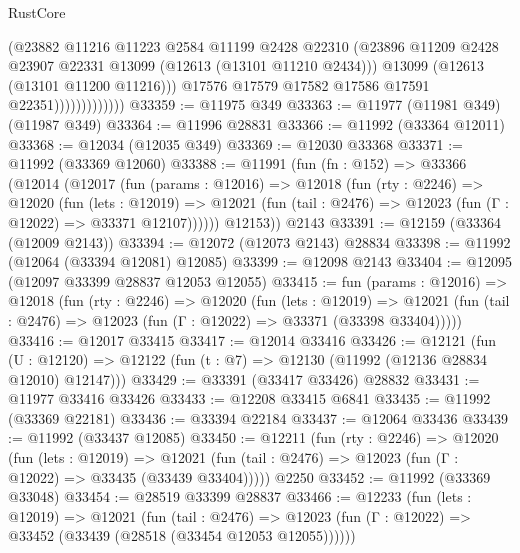 \begin{lexlean}{RustCore}
\begin{coremodule}
                              (@23882
                                @11216
                                @11223
                                @2584
                                @11199
                                @2428
                                @22310
                                (@23896
                                  @11209
                                  @2428
                                  @23907
                                  @22331
                                  @13099
                                  (@12613 (@13101 @11210 @2434)))
                                @13099
                                (@12613 (@13101 @11200 @11216)))
                              @17576
                              @17579
                              @17582
                              @17586
                              @17591
                              @22351)))))))))))))
@33359 := @11975 @349
@33363 := @11977 (@11981 @349) (@11987 @349)
@33364 := @11996 @28831
@33366 := @11992 (@33364 @12011)
@33368 := @12034 (@12035 @349)
@33369 := @12030 @33368
@33371 := @11992 (@33369 @12060)
@33388 := @11991
    (fun (fn : @152) =>
    @33366
      (@12014
        (@12017
          (fun (params : @12016) =>
          @12018
            (fun (rty : @2246) =>
            @12020
              (fun (lets : @12019) =>
              @12021 (fun (tail : @2476) => @12023 (fun (Γ : @12022) => @33371 @12107))))))
        @12153))
    @2143
@33391 := @12159 (@33364 (@12009 @2143))
@33394 := @12072 (@12073 @2143) @28834
@33398 := @11992 (@12064 (@33394 @12081) @12085)
@33399 := @12098 @2143
@33404 := @12095 (@12097 @33399 @28837 @12053 @12055)
@33415 := fun (params : @12016) =>
  @12018
    (fun (rty : @2246) =>
    @12020
      (fun (lets : @12019) =>
      @12021 (fun (tail : @2476) => @12023 (fun (Γ : @12022) => @33371 (@33398 @33404)))))
@33416 := @12017 @33415
@33417 := @12014 @33416
@33426 := @12121
    (fun (U : @12120) => @12122 (fun (t : @7) => @12130 (@11992 (@12136 @28834 @12010) @12147)))
@33429 := @33391 (@33417 @33426) @28832
@33431 := @11977 @33416 @33426
@33433 := @12208 @33415 @6841
@33435 := @11992 (@33369 @22181)
@33436 := @33394 @22184
@33437 := @12064 @33436
@33439 := @11992 (@33437 @12085)
@33450 := @12211
    (fun (rty : @2246) =>
    @12020
      (fun (lets : @12019) =>
      @12021 (fun (tail : @2476) => @12023 (fun (Γ : @12022) => @33435 (@33439 @33404)))))
    @2250
@33452 := @11992 (@33369 @33048)
@33454 := @28519 @33399 @28837
@33466 := @12233
    (fun (lets : @12019) =>
    @12021
      (fun (tail : @2476) =>
      @12023 (fun (Γ : @12022) => @33452 (@33439 (@28518 (@33454 @12053 @12055))))))

\end{coremodule}
\end{lexlean}
